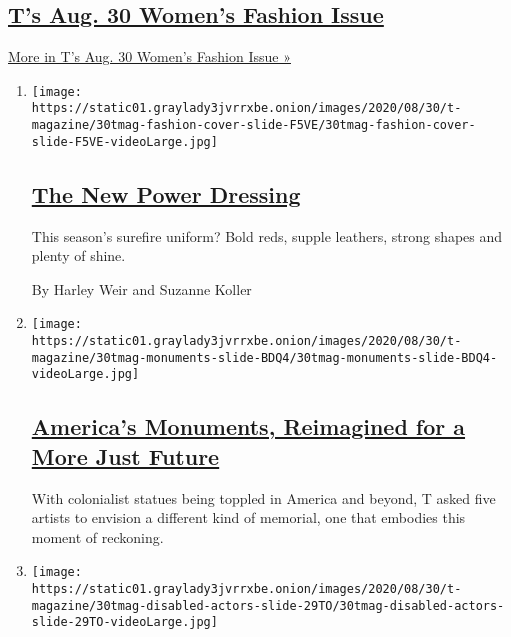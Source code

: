 \hypertarget{ts-aug-30-womens-fashion-issue}{%
\subsection{\texorpdfstring{\href{/issue/t-magazine/2020/08/21/ts-aug-30-womens-fashion-issue}{T's
Aug. 30 Women's Fashion
Issue}}{T's Aug. 30 Women's Fashion Issue}}\label{ts-aug-30-womens-fashion-issue}}

\href{/issue/t-magazine/2020/08/21/ts-aug-30-womens-fashion-issue}{More
in T's Aug. 30 Women's Fashion Issue »}

\begin{enumerate}
\def\labelenumi{\arabic{enumi}.}
\item
  \texttt{[image: https://static01.graylady3jvrrxbe.onion/images/2020/08/30/t-magazine/30tmag-fashion-cover-slide-F5VE/30tmag-fashion-cover-slide-F5VE-videoLarge.jpg]}

  \hypertarget{the-new-power-dressing}{%
  \subsection{\texorpdfstring{\href{/2020/08/26/t-magazine/fall-womens-fashion-cover.html}{The
  New Power
  Dressing}}{The New Power Dressing}}\label{the-new-power-dressing}}

  This season's surefire uniform? Bold reds, supple leathers, strong
  shapes and plenty of shine.

  By Harley Weir and Suzanne Koller
\item
  \texttt{[image: https://static01.graylady3jvrrxbe.onion/images/2020/08/30/t-magazine/30tmag-monuments-slide-BDQ4/30tmag-monuments-slide-BDQ4-videoLarge.jpg]}

  \hypertarget{americas-monuments-reimagined-for-a-more-just-future}{%
  \subsection{\texorpdfstring{\href{/2020/08/24/t-magazine/confederate-monuments-reimagined-racism.html}{America's
  Monuments, Reimagined for a More Just
  Future}}{America's Monuments, Reimagined for a More Just Future}}\label{americas-monuments-reimagined-for-a-more-just-future}}

  With colonialist statues being toppled in America and beyond, T asked
  five artists to envision a different kind of memorial, one that
  embodies this moment of reckoning.
\item
  \texttt{[image: https://static01.graylady3jvrrxbe.onion/images/2020/08/30/t-magazine/30tmag-disabled-actors-slide-29TO/30tmag-disabled-actors-slide-29TO-videoLarge.jpg]}


\end{enumerate}
